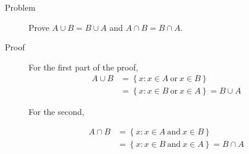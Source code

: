 \begin{description}
\item[Problem]
Prove $A \cup B = B \cup A$ and $A \cap B = B \cap A$.

\item[Proof]

For the first part of the proof,
\begin{equation*}
\begin{aligned}
A \cup B &= \left\{ x : x \in A\ \text{or}\ x \in B \right\}\\
         &= \left\{ x : x \in B\ \text{or}\ x \in A\right\} = B \cup A
\end{aligned}
\end{equation*}

For the second,

\begin{equation*}
\begin{aligned}
A \cap B &= \left\{ x : x \in A\ \text{and}\ x \in B \right\}\\
         &= \left\{ x : x \in B\ \text{and}\ x \in A\right\} = B \cap A
\end{aligned}
\end{equation*}

\end{description}
